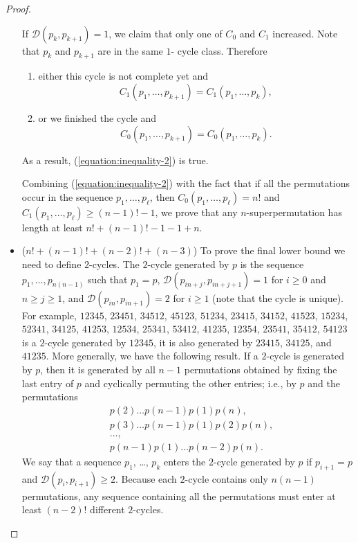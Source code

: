 \begin{proof}
\begin{itemize}
      If $\mathcal{D}(p_k, p_{k + 1}) = 1$, we claim that only one of $C_0$ and
      $C_1$ increased. Note that $p_k$ and $p_{k + 1}$ are in the same $1$-
      cycle class. Therefore
      \begin{enumerate}
        \item either this cycle is not complete yet and
          \[
            C_1(p_1, \dots, p_{k + 1}) = C_1(p_1, \dots, p_k),
          \]
        \item or we finished the cycle and
          \[
            C_0(p_1, \dots, p_{k + 1}) = C_0(p_1, \dots, p_k).
          \]
      \end{enumerate}
      As a result, (\ref{equation:inequality-2}) is true.

      Combining (\ref{equation:inequality-2}) with the
      fact that if all the
      permutations occur in the sequence $p_1, \dots, p_\ell$, then
      $C_0(p_1, \dots, p_\ell) = n!$ and $C_1(p_1, \dots, p_\ell) \ge
      (n - 1)! - 1$,
      we prove that any $n$-superpermutation has length at least
      $n! + (n - 1)! - 1 - 1 + n$.
    \item ($n! + (n - 1)! + (n - 2)! + (n - 3)$)
      To prove the final lower bound we need to define $2$-cycles. The $2$-cycle
      generated by $p$ is the sequence $p_1, \dots, p_{n(n - 1)}$ such that
      $p_1 = p$, $\mathcal{D}(p_{in + j}, p_{in + j + 1}) = 1$ for $i \ge 0$
      and $n \ge j \ge 1$, and $\mathcal{D}(p_{in}, p_{in + 1}) = 2$ for
      $i \ge 1$ (note that the cycle is unique). For example,
      $12345$, $23451$, $34512$, $45123$, $51234$, $23415$, $34152$, $41523$,
      $15234$, $52341$, $34125$, $41253$, $12534$, $25341$, $53412$, $41235$,
      $12354$, $23541$, $35412$, $54123$ is a $2$-cycle generated by $12345$,
      it is also generated by $23415$, $34125$, and $41235$. More generally, we
      have the following result. If a $2$-cycle is generated by $p$, then it is
      generated by all $n - 1$ permutations obtained by fixing the
      last entry of $p$ and cyclically permuting the other entries; i.e., by
      $p$ and the permutations
      \begin{align*}
        &p(2) \dots p(n - 1) p(1)p(n), \\
        &p(3) \dots p(n - 1) p(1) p(2) p(n), \\
        &\dots, \\
        &p(n - 1) p(1) \dots p(n - 2) p(n).
      \end{align*}
      We say that a sequence $p_1$, \dots, $p_k$ enters the $2$-cycle generated
      by $p$ if $p_{i + 1} = p$ and $\mathcal{D}(p_i, p_{i + 1}) \ge 2$.
      Because each $2$-cycle contains only $n (n - 1)$ permutations, any
      sequence containing all the permutations must enter at least $(n - 2)!$
      different $2$-cycles.


\end{itemize}
\end{proof}
